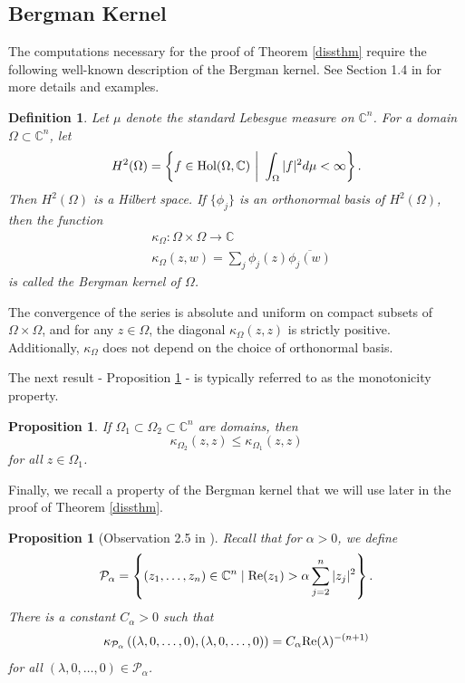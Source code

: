 \documentclass[12pt]{article}
\newcommand{\C}{\mathbb{C}}
\newcommand{\re}{\textup{Re}}
\newcommand{\Hol}{\textup{Hol}}
\newtheorem{proposition}[lemma]{Proposition}
\newtheorem{defnition}[lemma]{Definition}
\newenvironment{definition}{\begin{defnition} \em}{\end{defnition}}
\begin{document}
\subsection{Bergman Kernel}

The computations necessary for the proof of Theorem \ref{dissthm} require the following well-known description of the Bergman kernel. See Section 1.4 in \cite{Krantz} for more details and examples. 

\begin{definition}
\label{bergmankerneldef}
Let $\mu$ denote the standard Lebesgue measure on $\C^n$. For a domain $\Omega\subset\C^n$, let 
$$H^2(\Omega)=\left\{f\in\Hol(\Omega,\C) \ \bigg| \ \int_{\Omega}|f|^2d\mu<\infty\right\}.$$
Then $H^2(\Omega)$ is a Hilbert space. If $\{\phi_j\}$ is an orthonormal basis of $H^2(\Omega)$, then the function 
\begin{align*}
    &\kappa_{\Omega}:\Omega\times\Omega\to\C\\
    &\kappa_{\Omega}(z,w)=\sum_j\phi_j(z)\overline{\phi_j(w)}
\end{align*}
is called the \textit{Bergman kernel} of $\Omega$.
\end{definition}

The convergence of the series is absolute and uniform on compact subsets of $\Omega\times\Omega$, and for any $z\in\Omega$, the diagonal $\kappa_{\Omega}(z,z)$ is strictly positive. Additionally, $\kappa_{\Omega}$ does not depend on the choice of orthonormal basis.

The next result - Proposition \ref{ZimProp2.3} - is typically referred to as the monotonicity property. 

\begin{proposition}
\label{ZimProp2.3}
If $\Omega_1\subset\Omega_2\subset\C^n$ are domains, then 
$$\kappa_{\Omega_2}(z,z)\le\kappa_{\Omega_1}(z,z)$$
for all $z\in\Omega_1$.
\end{proposition}

Finally, we recall a property of the Bergman kernel \cite{Zimmer} that we will use later in the proof of Theorem \ref{dissthm}.

\begin{proposition}[Observation 2.5 in \cite{Zimmer}]
\label{ZimObs2.5}
Recall that for $\alpha>0$, we define 
$$\mathcal{P}_{\alpha}=\left\{(z_1,\dots,z_n)\in\C^n\mid\re(z_1)>\alpha\sum_{j=2}^{n}|z_j|^2\right\}.$$
There is a constant $C_{\alpha}>0$ such that
$$\kappa_{\mathcal{P}_{\alpha}}\left((\lambda,0,\dots,0),(\lambda,0,\dots,0)\right)=C_{\alpha}\re(\lambda)^{-(n+1)}$$
for all $(\lambda,0,\dots,0)\in\mathcal{P}_{\alpha}$.
\end{proposition}
\end{document}
